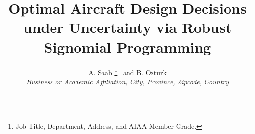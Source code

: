  \title{Optimal Aircraft Design Decisions under Uncertainty via Robust Signomial Programming}

 \author{
  A. Saab%
    \thanks{Job Title, Department, Address, and AIAA Member Grade.}
  \ and B. Ozturk\\
  {\normalsize\itshape
   Business or Academic Affiliation, City, Province, Zipcode, Country}\\
 }


 \newcommand{\eqnref}[1]{(\ref{#1})}
 \newcommand{\class}[1]{\texttt{#1}}
 \newcommand{\package}[1]{\texttt{#1}}
 \newcommand{\file}[1]{\texttt{#1}}
 \newcommand{\BibTeX}{\textsc{Bib}\TeX}

\renewcommand{\vec}{\mathbf}
\newcommand{\mat}{\mathbf}

\usepackage[utf8]{inputenc}
\usepackage{algorithm}
\usepackage{bbm}
\usepackage{amsmath}
\usepackage{amsthm}
\usepackage{amssymb}
\usepackage{multicol}
\usepackage{tabularx}
\usepackage[toc,page]{appendix}
\usepackage{verbatim}
\usepackage{tikz}
\usepackage{tkz-kiviat}
\usetikzlibrary{arrows}
\usepackage{subcaption} 
\usepackage{graphicx}

 \newtheorem{theorem}{Theorem}[section]
 \newtheorem{corollary}{Corollary}[theorem]
 \newtheorem{lemma}[theorem]{Lemma}
 \newtheorem{proposition}[theorem]{Proposition}
